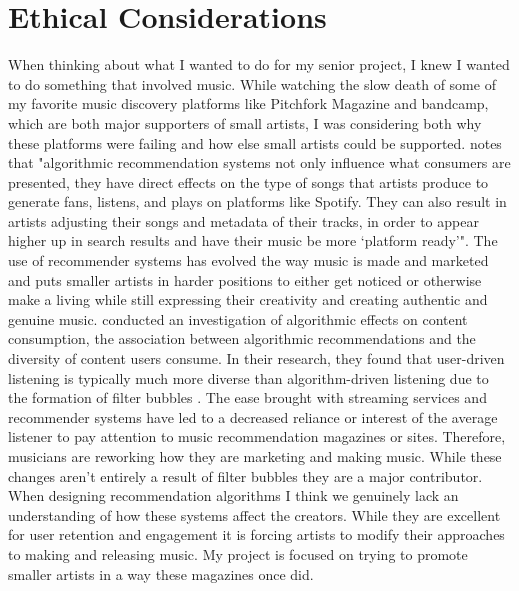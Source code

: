 \documentclass[10pt,twocolumn]{article}
\begin{document}
\section{Ethical Considerations}
When thinking about what I wanted to do for my senior project, I knew I wanted to do something that involved music. While watching the slow death of some of my favorite music discovery platforms like Pitchfork Magazine and bandcamp, which are both major supporters of small artists, I was considering both why these platforms were failing and how else small artists could be supported. \textcite{BornCurationCulture} notes that "algorithmic recommendation systems not only influence what consumers are presented, they have direct effects on the type of songs that artists produce to generate fans, listens, and plays on platforms like Spotify. They can also result in artists adjusting their songs and metadata of their tracks, in order to appear higher up in search results and have their music be more ‘platform ready’". The use of recommender systems has evolved the way music is made and marketed and puts smaller artists in harder positions to either get noticed or otherwise make a living while still expressing their creativity and creating authentic and genuine music. \textcite{AndersonDiversity} conducted an investigation of algorithmic effects on content consumption, the association between algorithmic recommendations and the diversity of content users consume. In their research, they found that user-driven listening is typically much more diverse than algorithm-driven listening due to the formation of filter bubbles \cite{AndersonDiversity}. The ease brought with streaming services and recommender systems have led to a decreased reliance or interest of the average listener to pay attention to music recommendation magazines or sites. Therefore, musicians are reworking how they are marketing and making music. While these changes aren't entirely a result of filter bubbles they are a major contributor. When designing recommendation algorithms I think we genuinely lack an understanding of how these systems affect the creators. While they are excellent for user retention and engagement it is forcing artists to modify their approaches to making and releasing music. My project is focused on trying to promote smaller artists in a way these magazines once did.\\
\end{document}
